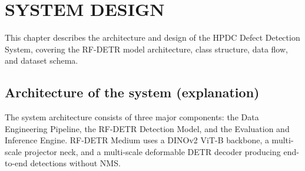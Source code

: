\chapter{SYSTEM DESIGN}

\justify

This chapter describes the architecture and design of the HPDC Defect Detection System, covering the RF-DETR model architecture, class structure, data flow, and dataset schema.

\section {Architecture of the system (explanation)}
\justify

The system architecture consists of three major components: the Data Engineering Pipeline, the RF-DETR Detection Model, and the Evaluation and Inference Engine. RF-DETR Medium uses a DINOv2 ViT-B backbone, a multi-scale projector neck, and a multi-scale deformable DETR decoder producing end-to-end detections without NMS.


